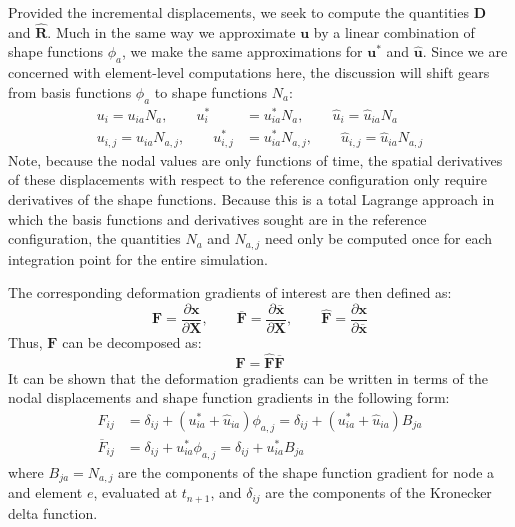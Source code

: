 Provided the incremental displacements, we seek to compute the quantities $\bm{D}$ and $\hat{\bm{R}}$. Much in the same way we approximate $\bm{u}$ by a linear combination of shape functions $\phi_a$, we make the same approximations for $\bm{u}^*$ and $\hat{\bm{u}}$. Since we are concerned with element-level computations here, the discussion will shift gears from basis functions $\phi_a$ to shape functions $N_a$:
\begin{align}
u_i = u_{ia}N_a, \qquad u^*_i &= u^*_{ia}N_a, \qquad \hat{u}_i = \hat{u}_{ia}N_a \\
u_{i,j} = u_{ia}N_{a,j}, \qquad u^*_{i,j} &= u^*_{ia}N_{a,j}, \qquad \hat{u}_{i,j} = \hat{u}_{ia}N_{a,j}
\end{align}
Note, because the nodal values are only functions of time, the spatial derivatives of these displacements with respect to the reference configuration only require derivatives of the shape functions. Because this is a total Lagrange approach in which the basis functions and derivatives sought are in the reference configuration, the quantities $N_a$ and $N_{a,j}$ need only be computed once for each integration point for the entire simulation.

The corresponding deformation gradients of interest are then defined as:
\begin{equation}
\bm{F} = \frac{\partial \bm{x}}{\partial \bm{X}}, \qquad \bm{\overline{F}} = \frac{\partial \bm{\overline{x}}}{\partial \bm{X}}, \qquad \hat{\bm{F}} = \frac{\partial \bm{x}}{\partial \bm{\overline{x}}}
\end{equation}
Thus, $\bm{F}$ can be decomposed as:
\begin{equation}
\bm{F} = \hat{\bm{F}}\bm{\overline{F}}
\end{equation}
It can be shown that the deformation gradients can be written in terms of the nodal displacements and shape function gradients in the following form:
\begin{align}
F_{ij} &= \delta_{ij} + \left(u^*_{ia} + \hat{u}_{ia} \right) \phi_{a,j} = \delta_{ij} + \left(u^*_{ia} + \hat{u}_{ia} \right) B_{ja} \\
\overline{F}_{ij} &= \delta_{ij} + u^*_{ia} \phi_{a,j} = \delta_{ij} + u^*_{ia} B_{ja}
\end{align}
where $B_{ja} = N_{a,j}$ are the components of the shape function gradient for node a and element $e$, evaluated at $t_{n+1}$, and $\delta_{ij}$ are the components of the Kronecker delta function.

